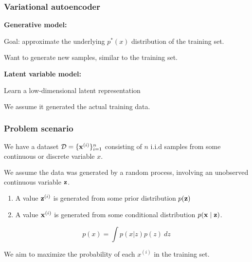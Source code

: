 \documentclass[t]{beamer}
\begin{document}
\begin{frame}
  \frametitle{Variational autoencoder}

  \textbf{Generative model:}

  \vspace{10pt}

  Goal: approximate the underlying $p^*(x)$ distribution of
  the training set.

  \vspace{10pt}

  Want to generate new samples, similar to the training
  set.

  \vspace{20pt}

  \textbf{Latent variable model:}

  \vspace{10pt}

  Learn a low-dimensional latent representation

  \vspace{10pt}

  We assume it generated the actual training data. 
\end{frame}

\begin{frame}
  \frametitle{Problem scenario}

  We have a dataset
  ${\mathcal{D}} = \{{\bf{x}}^{(i)}\}_{i=1}^n$ consisting of
  $n$ i.i.d samples from some continuous or discrete
  variable $x$.

  \vspace{2mm}
  
  We assume the data was generated by a random process,
  involving an unobserved continuous variable ${\bf{z}}$.

  \begin{enumerate}
  \item A value ${\bf{z}}^{(i)}$ is generated from some
    prior distribution $p({\bf{z}})$
    
    \vspace{2mm}
    
  \item A value ${\bf{x}}^{(i)}$ is generated from some
    conditional distribution
    $p({\bf{x}} \mid{\bf{z}})$.
  \end{enumerate}

  \vspace{2mm}

  \[
    p(x) = \int p(x|z) p(z)\ dz
  \]

  
  \vspace{2mm}

  We aim to maximize the probability of each $x^{(i)}$ in the
  training set.  

 \end{frame}
\end{document}
